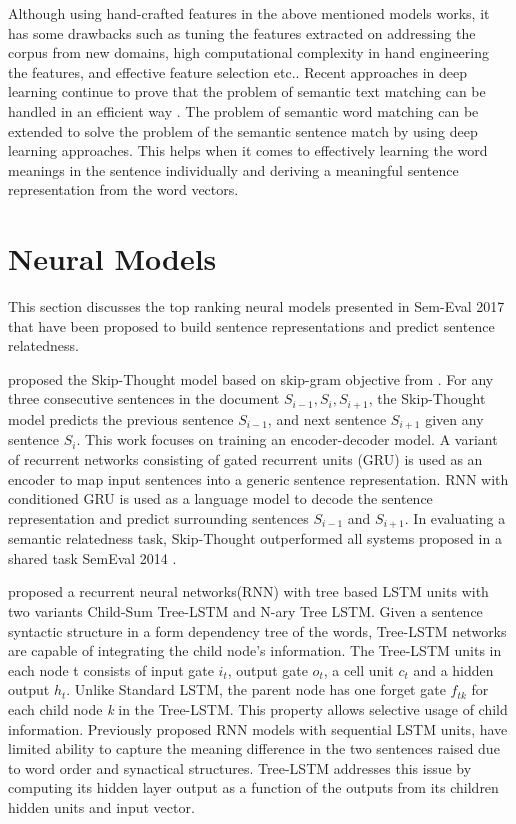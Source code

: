 \documentclass[12pt]{report} %
\begin{document}
Although using hand-crafted features in the above mentioned models works, it has some drawbacks such as tuning the features extracted on addressing the corpus from new domains, high computational complexity in hand engineering the features, and effective feature selection etc.. Recent approaches in deep learning continue to prove that the problem of semantic text matching can be handled in an efficient way \citep{cer2017semeval}. The problem of semantic word matching can be extended to solve the problem of the semantic sentence match by using deep learning approaches. This helps when it comes to effectively learning the word meanings in the sentence individually and deriving a meaningful sentence representation from the word vectors.  

\section{Neural Models}
\label{nu_models_rw} 

This section discusses the top ranking neural models presented in Sem-Eval 2017 that have been proposed to build sentence representations and predict sentence relatedness.

\cite{kiros2015skip} proposed the Skip-Thought model based on skip-gram objective from \cite{mikolov2014word2vec}. For any three consecutive sentences in the document $S_{i-1}, S_{i}, S_{i+1}$, the Skip-Thought model predicts the previous sentence $S_{i-1}$, and next sentence $S_{i+1}$ given any sentence $S_{i}$.
This work focuses on training an encoder-decoder model. A variant of recurrent networks consisting of gated recurrent units (GRU) \citep{cho2014learning} is used as an encoder to map input sentences into a generic sentence representation. RNN with conditioned GRU is used as a language model to decode the sentence representation and predict surrounding sentences $S_{i-1}$ and $S_{i+1}$. In evaluating a semantic relatedness task, Skip-Thought outperformed all systems proposed in a shared task SemEval 2014 \citep{marelli2014semeval}.

\cite{tai2015improved} proposed a recurrent neural networks(RNN) with tree based LSTM units with two variants Child-Sum Tree-LSTM and N-ary Tree LSTM. Given a sentence syntactic structure in a form dependency tree of the words, Tree-LSTM networks are capable of integrating the child node's information. The Tree-LSTM units in each node t consists of input gate $i_{t}$, output gate $o_{t}$, a cell unit $c_{t}$ and a hidden output $h_{t}$. Unlike Standard LSTM, the parent node has one forget gate $f_{tk}$ for each child node \textit{k} in the Tree-LSTM. This property allows selective usage of child information. Previously proposed RNN models with sequential LSTM units, have limited ability to capture the meaning difference in the two sentences raised due to word order and synactical structures. Tree-LSTM addresses this issue by computing its hidden layer output as a function of the outputs from its children hidden units and input vector. 
\end{document}
